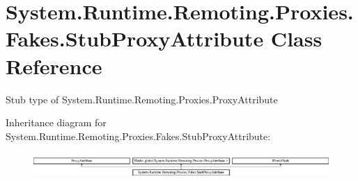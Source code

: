 \hypertarget{class_system_1_1_runtime_1_1_remoting_1_1_proxies_1_1_fakes_1_1_stub_proxy_attribute}{\section{System.\-Runtime.\-Remoting.\-Proxies.\-Fakes.\-Stub\-Proxy\-Attribute Class Reference}
\label{class_system_1_1_runtime_1_1_remoting_1_1_proxies_1_1_fakes_1_1_stub_proxy_attribute}
}


Stub type of System.\-Runtime.\-Remoting.\-Proxies.\-Proxy\-Attribute 


Inheritance diagram for System.\-Runtime.\-Remoting.\-Proxies.\-Fakes.\-Stub\-Proxy\-Attribute\-:\begin{figure}[H]
\begin{center}
\leavevmode
\includegraphics[height=0.974761cm]{class_system_1_1_runtime_1_1_remoting_1_1_proxies_1_1_fakes_1_1_stub_proxy_attribute}
\end{center}
\end{figure}

